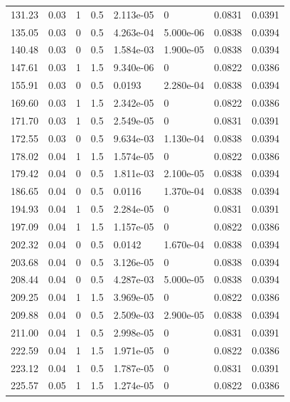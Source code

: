 \documentclass[preview]{standalone}
\begin{document}
{{\begin{tabular}{L{1.2cm}C{1.2cm} C{0.3cm}C{0.5cm} C{1.4cm}C{1.4cm} C{1.4cm}C{1.4cm}}
  131.23  &  0.03  & 1     & 0.5 &  2.113e-05  & 0  & 0.0831 &  0.0391   \\ 
  135.05  &  0.03  & 0     & 0.5 &  4.263e-04  & 5.000e-06  & 0.0838 &  0.0394   \\ 
  140.48  &  0.03  & 0     & 0.5 &  1.584e-03  & 1.900e-05  & 0.0838 &  0.0394   \\ 
  147.61  &  0.03  & 1     & 1.5 &  9.340e-06  & 0  & 0.0822 &  0.0386   \\ 
  155.91  &  0.03  & 0     & 0.5 &  0.0193  & 2.280e-04  & 0.0838 &  0.0394   \\ 
  169.60  &  0.03  & 1     & 1.5 &  2.342e-05  & 0  & 0.0822 &  0.0386   \\ 
  171.70  &  0.03  & 1     & 0.5 &  2.549e-05  & 0  & 0.0831 &  0.0391   \\ 
  172.55  &  0.03  & 0     & 0.5 &  9.634e-03  & 1.130e-04  & 0.0838 &  0.0394   \\ 
  178.02  &  0.04  & 1     & 1.5 &  1.574e-05  & 0  & 0.0822 &  0.0386   \\ 
  179.42  &  0.04  & 0     & 0.5 &  1.811e-03  & 2.100e-05  & 0.0838 &  0.0394   \\ 
  186.65  &  0.04  & 0     & 0.5 &  0.0116  & 1.370e-04  & 0.0838 &  0.0394   \\ 
  194.93  &  0.04  & 1     & 0.5 &  2.284e-05  & 0  & 0.0831 &  0.0391   \\ 
  197.09  &  0.04  & 1     & 1.5 &  1.157e-05  & 0  & 0.0822 &  0.0386   \\ 
  202.32  &  0.04  & 0     & 0.5 &  0.0142  & 1.670e-04  & 0.0838 &  0.0394   \\ 
  203.68  &  0.04  & 0     & 0.5 &  3.126e-05  & 0  & 0.0838 &  0.0394   \\ 
  208.44  &  0.04  & 0     & 0.5 &  4.287e-03  & 5.000e-05  & 0.0838 &  0.0394   \\ 
  209.25  &  0.04  & 1     & 1.5 &  3.969e-05  & 0  & 0.0822 &  0.0386   \\ 
  209.88  &  0.04  & 0     & 0.5 &  2.509e-03  & 2.900e-05  & 0.0838 &  0.0394   \\ 
  211.00  &  0.04  & 1     & 0.5 &  2.998e-05  & 0  & 0.0831 &  0.0391   \\ 
  222.59  &  0.04  & 1     & 1.5 &  1.971e-05  & 0  & 0.0822 &  0.0386   \\ 
  223.12  &  0.04  & 1     & 0.5 &  1.787e-05  & 0  & 0.0831 &  0.0391   \\ 
  225.57  &  0.05  & 1     & 1.5 &  1.274e-05  & 0  & 0.0822 &  0.0386   \\ 

\end{tabular}}}
\end{document}
